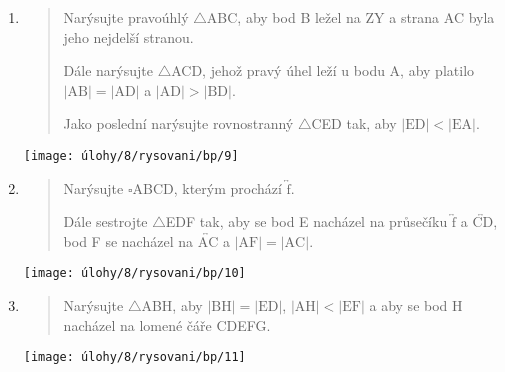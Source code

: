 \begin{enumerate}
    \item
    \begin{minipage}[t]{\linewidth}
        \begin{quote}
            Narýsujte pravoúhlý $\triangle$ABC, aby bod B ležel na $\text{ZY}$ a strana AC byla jeho nejdelší stranou.

            Dále narýsujte $\triangle$ACD, jehož pravý úhel leží u bodu A, aby platilo $\lvert \text{AB} \rvert = \lvert \text{AD} \rvert$ a $\lvert \text{AD} \rvert > \lvert \text{BD} \rvert$.

            Jako poslední narýsujte rovnostranný $\triangle$CED tak, aby ${\lvert \text{ED} \rvert < \lvert \text{EA} \rvert}$.
        \end{quote}
        \centering
        \texttt{[image: úlohy/8/rysovani/bp/9]}

    \end{minipage}

    \item
    \begin{minipage}[t]{\linewidth}
        \begin{quote}
            Narýsujte $\square$ABCD, kterým prochází $\overleftrightarrow{\text{f}}$.

            Dále sestrojte $\triangle$EDF tak, aby se bod E nacházel na průsečíku $\overleftrightarrow{\text{f}}$ a $\overleftrightarrow{\text{CD}}$, bod F se nacházel na $\overleftrightarrow{\text{AC}}$ a $\lvert \text{AF} \rvert = \lvert \text{AC} \rvert$.
        \end{quote}
        \centering
        \texttt{[image: úlohy/8/rysovani/bp/10]}

    \end{minipage}

    \item
    \begin{minipage}[t]{\linewidth}
        \begin{quote}
            Narýsujte $\triangle$ABH, aby $\lvert \text{BH} \rvert = \lvert \text{ED} \rvert$, $\lvert \text{AH} \rvert < \lvert \text{EF} \rvert$ a aby se bod H nacházel na lomené čáře CDEFG\@.
        \end{quote}
        \centering
        \texttt{[image: úlohy/8/rysovani/bp/11]}

    \end{minipage}
\end{enumerate}


\newpage

